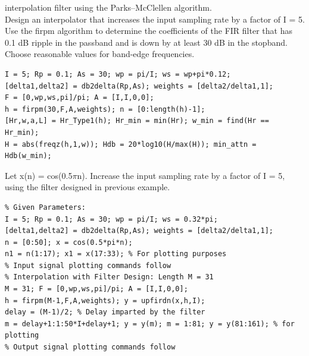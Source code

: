 \documentclass{article}
\begin{document}
interpolation filter using the Parks–McClellen algorithm. \\
\vspace{1em}
Design an interpolator that increases the input sampling rate by a factor of
I = 5. Use the firpm algorithm to determine the coefficients of the FIR filter
that has 0.1 dB ripple in the passband and is down by at least 30 dB in the
stopband. Choose reasonable values for band-edge frequencies.
\begin{lstlisting}
I = 5; Rp = 0.1; As = 30; wp = pi/I; ws = wp+pi*0.12;
[delta1,delta2] = db2delta(Rp,As); weights = [delta2/delta1,1];
F = [0,wp,ws,pi]/pi; A = [I,I,0,0];
h = firpm(30,F,A,weights); n = [0:length(h)-1];
[Hr,w,a,L] = Hr_Type1(h); Hr_min = min(Hr); w_min = find(Hr == Hr_min);
H = abs(freqz(h,1,w)); Hdb = 20*log10(H/max(H)); min_attn = Hdb(w_min); 
\end{lstlisting}
Let x(n) = cos(0.5$\pi$n). Increase the input sampling rate by a factor of I = 5,
using the filter designed in previous example.
\begin{lstlisting}
% Given Parameters:
I = 5; Rp = 0.1; As = 30; wp = pi/I; ws = 0.32*pi;
[delta1,delta2] = db2delta(Rp,As); weights = [delta2/delta1,1];
n = [0:50]; x = cos(0.5*pi*n);
n1 = n(1:17); x1 = x(17:33); % For plotting purposes
% Input signal plotting commands follow
% Interpolation with Filter Design: Length M = 31
M = 31; F = [0,wp,ws,pi]/pi; A = [I,I,0,0];
h = firpm(M-1,F,A,weights); y = upfirdn(x,h,I);
delay = (M-1)/2; % Delay imparted by the filter
m = delay+1:1:50*I+delay+1; y = y(m); m = 1:81; y = y(81:161); % for plotting
% Output signal plotting commands follow
\end{lstlisting}
\end{document}
